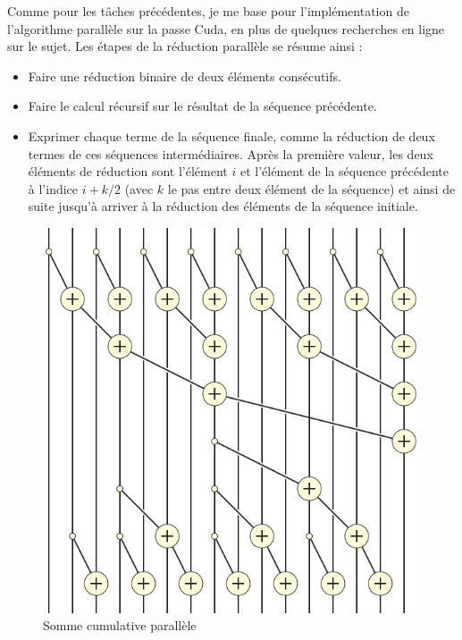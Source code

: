 Comme pour les tâches précédentes, je me base pour l'implémentation de
l'algorithme parallèle sur la passe Cuda, en plus de quelques recherches en
ligne sur le sujet. Les étapes de la réduction parallèle se résume ainsi :
\begin{itemize}
   \item Faire une réduction binaire de deux éléments consécutifs.
   \item Faire le calcul récursif sur le résultat de la séquence précédente.
   \item Exprimer chaque terme de la séquence finale, comme la réduction de deux
      termes de ces séquences intermédiaires. Après la première valeur, les deux
      éléments de réduction sont l'élément $i$ et l'élément de la séquence
      précédente à l'indice $i+k/2$ (avec $k$ le pas entre deux élément de la
      séquence) et ainsi de suite jusqu'à arriver à la réduction des éléments de
      la séquence initiale.
\end{itemize}

\begin{figure}[h]
   \begin{center}
      \includegraphics[scale=0.3]{./images/prefix_sum.png}
   \end{center}
   \caption{Somme cumulative parallèle~\cite{prefix_sum}}
   \label{prefix_sum}
\end{figure}

